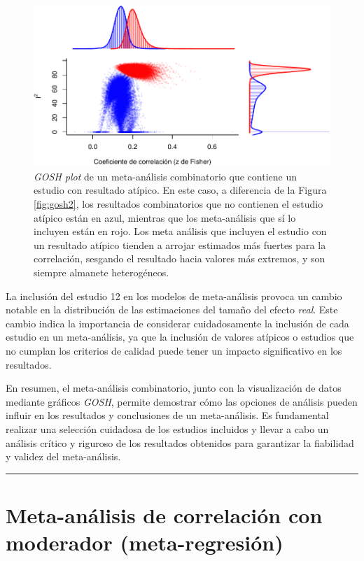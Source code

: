 \documentclass[
  bookmarksnumbered]{article}
\begin{document}
\begin{figure}
\centering
\includegraphics{Meta-analysis_files/figure-latex/gosh3-1.pdf}
\caption{\label{fig:gosh3}\emph{GOSH plot} de un meta-análisis combinatorio que contiene un estudio con resultado atípico. En este caso, a diferencia de la Figura \ref{fig:gosh2}, los resultados combinatorios que no contienen el estudio atípico están en azul, mientras que los meta-análisis que sí lo incluyen están en rojo. Los meta análisis que incluyen el estudio con un resultado atípico tienden a arrojar estimados más fuertes para la correlación, sesgando el resultado hacia valores más extremos, y son siempre almanete heterogéneos.}
\end{figure}

La inclusión del estudio 12 en los modelos de meta-análisis provoca un cambio notable en la distribución de las estimaciones del tamaño del efecto \emph{real}. Este cambio indica la importancia de considerar cuidadosamente la inclusión de cada estudio en un meta-análisis, ya que la inclusión de valores atípicos o estudios que no cumplan los criterios de calidad puede tener un impacto significativo en los resultados.

En resumen, el meta-análisis combinatorio, junto con la visualización de datos mediante gráficos \emph{GOSH}, permite demostrar cómo las opciones de análisis pueden influir en los resultados y conclusiones de un meta-análisis. Es fundamental realizar una selección cuidadosa de los estudios incluidos y llevar a cabo un análisis crítico y riguroso de los resultados obtenidos para garantizar la fiabilidad y validez del meta-análisis.

\begin{center}\rule{0.5\linewidth}{0.5pt}\end{center}

\hypertarget{met-moderation}{%
\section{Meta-análisis de correlación con moderador (meta-regresión)}\label{met-moderation}}
\end{document}
